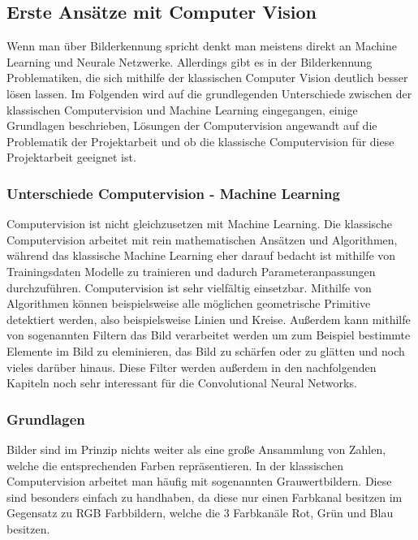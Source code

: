 \documentclass[12pt, a4paper]{article}
\begin{document}
\subsection{Erste Ansätze mit Computer Vision}
Wenn man über Bilderkennung spricht denkt man meistens direkt an Machine Learning und Neurale Netzwerke. Allerdings gibt es in der Bilderkennung Problematiken, die sich mithilfe der klassischen Computer Vision deutlich besser lösen lassen. Im Folgenden wird auf die grundlegenden Unterschiede zwischen der klassischen Computervision und Machine Learning eingegangen, einige Grundlagen beschrieben, Lösungen der Computervision angewandt auf die Problematik der Projektarbeit und ob die klassische Computervision für diese Projektarbeit geeignet ist.

\subsubsection{Unterschiede Computervision - Machine Learning}
Computervision ist nicht gleichzusetzen mit Machine Learning. Die klassische Computervision arbeitet mit rein mathematischen Ansätzen und Algorithmen, während das klassische Machine Learning eher darauf bedacht ist mithilfe von Trainingsdaten Modelle zu trainieren und dadurch Parameteranpassungen durchzuführen. Computervision ist sehr vielfältig einsetzbar. Mithilfe von Algorithmen können beispielsweise alle möglichen geometrische Primitive detektiert werden, also beispielsweise Linien und Kreise. Außerdem kann mithilfe von sogenannten Filtern das Bild verarbeitet werden um zum Beispiel bestimmte Elemente im Bild zu eleminieren, das Bild zu schärfen oder zu glätten und noch vieles darüber hinaus. Diese Filter werden außerdem in den nachfolgenden Kapiteln noch sehr interessant für die Convolutional Neural Networks.

\subsubsection{Grundlagen}
Bilder sind im Prinzip nichts weiter als eine große Ansammlung von Zahlen, welche die entsprechenden Farben repräsentieren. In der klassischen Computervision arbeitet man häufig mit sogenannten Grauwertbildern. Diese sind besonders einfach zu handhaben, da diese nur einen Farbkanal besitzen im Gegensatz zu RGB Farbbildern, welche die 3 Farbkanäle Rot, Grün und Blau besitzen.
\end{document}
